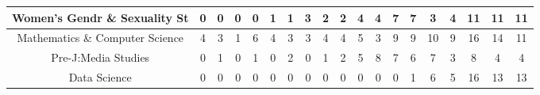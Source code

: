 \documentclass[10pt]{article}
\begin{document}
\begin{landscape}
\begin{longtable}[c]{|ccccccccccccccccccc|}
	\multicolumn{1}{|c|}{Women's Gendr \& Sexuality St}              & \multicolumn{1}{c|}{0}          & \multicolumn{1}{c|}{0}          & \multicolumn{1}{c|}{0}          & \multicolumn{1}{c|}{0}          & \multicolumn{1}{c|}{1}          & \multicolumn{1}{c|}{1}          & \multicolumn{1}{c|}{3}          & \multicolumn{1}{c|}{2}          & \multicolumn{1}{c|}{2}          & \multicolumn{1}{c|}{4}          & \multicolumn{1}{c|}{4}          & \multicolumn{1}{c|}{7}          & \multicolumn{1}{c|}{7}          & \multicolumn{1}{c|}{3}          & \multicolumn{1}{c|}{4}          & \multicolumn{1}{c|}{11}         & \multicolumn{1}{c|}{11}         & 11         \\ \hline
	\multicolumn{1}{|c|}{Mathematics \& Computer Science}            & \multicolumn{1}{c|}{4}          & \multicolumn{1}{c|}{3}          & \multicolumn{1}{c|}{1}          & \multicolumn{1}{c|}{6}          & \multicolumn{1}{c|}{4}          & \multicolumn{1}{c|}{3}          & \multicolumn{1}{c|}{3}          & \multicolumn{1}{c|}{4}          & \multicolumn{1}{c|}{4}          & \multicolumn{1}{c|}{5}          & \multicolumn{1}{c|}{3}          & \multicolumn{1}{c|}{9}          & \multicolumn{1}{c|}{9}          & \multicolumn{1}{c|}{10}         & \multicolumn{1}{c|}{9}          & \multicolumn{1}{c|}{16}         & \multicolumn{1}{c|}{14}         & 11         \\ \hline
	\multicolumn{1}{|c|}{Pre-J:Media Studies}                        & \multicolumn{1}{c|}{0}          & \multicolumn{1}{c|}{1}          & \multicolumn{1}{c|}{0}          & \multicolumn{1}{c|}{1}          & \multicolumn{1}{c|}{0}          & \multicolumn{1}{c|}{2}          & \multicolumn{1}{c|}{0}          & \multicolumn{1}{c|}{1}          & \multicolumn{1}{c|}{2}          & \multicolumn{1}{c|}{5}          & \multicolumn{1}{c|}{8}          & \multicolumn{1}{c|}{7}          & \multicolumn{1}{c|}{6}          & \multicolumn{1}{c|}{7}          & \multicolumn{1}{c|}{3}          & \multicolumn{1}{c|}{8}          & \multicolumn{1}{c|}{4}          & 4          \\ \hline
	\multicolumn{1}{|c|}{Data Science}                               & \multicolumn{1}{c|}{0}          & \multicolumn{1}{c|}{0}          & \multicolumn{1}{c|}{0}          & \multicolumn{1}{c|}{0}          & \multicolumn{1}{c|}{0}          & \multicolumn{1}{c|}{0}          & \multicolumn{1}{c|}{0}          & \multicolumn{1}{c|}{0}          & \multicolumn{1}{c|}{0}          & \multicolumn{1}{c|}{0}          & \multicolumn{1}{c|}{0}          & \multicolumn{1}{c|}{0}          & \multicolumn{1}{c|}{1}          & \multicolumn{1}{c|}{6}          & \multicolumn{1}{c|}{5}          & \multicolumn{1}{c|}{16}         & \multicolumn{1}{c|}{13}         & 13         \\ \hline

\end{longtable}
\end{landscape}
\end{document}

